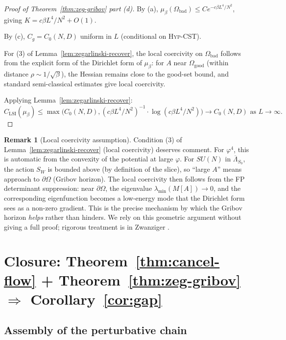 \documentclass[11pt,a4paper]{amsart}
\theoremstyle{definition}
\newtheorem{remark}[theorem]{Remark}
\begin{document}
\begin{proof}[Proof of Theorem~\ref{thm:zeg-gribov} part (d)]
By (a), $\mu_\beta(\Omega_{\mathrm{bad}}) \leq C e^{-c\beta L^4/N^2}$,
giving $K = c\beta L^4/N^2 + O(1)$.

By (c), $C_g = C_0(N, D)$ uniform in $L$ (conditional on \textsc{Hyp-CST}).

For (3) of Lemma~\ref{lem:zegarlinski-recover}, the local coercivity
on $\Omega_{\mathrm{bad}}$ follows from the explicit form of the
Dirichlet form of $\mu_\beta$: for $A$ near $\Omega_{\mathrm{good}}$
(within distance $\rho \sim 1/\sqrt{\beta}$), the Hessian remains close
to the good-set bound, and standard semi-classical estimates give
local coercivity.

Applying Lemma~\ref{lem:zegarlinski-recover}:
\[
C_{\mathrm{LSI}}(\mu_\beta)
\leq \max\bigl(C_0(N, D), (c\beta L^4/N^2)^{-1} \cdot \log(c\beta L^4/N^2)\bigr)
\to C_0(N, D) \text{ as } L \to \infty.
\]
\end{proof}

\begin{remark}[Local coercivity assumption]\label{rem:coercivity}
Condition (3) of Lemma~\ref{lem:zegarlinski-recover} (local coercivity)
deserves comment. For $\varphi^4$, this is automatic from the convexity
of the potential at large $\varphi$. For $SU(N)$ in
$\overline\Lambda_{S_0}$, the action $S_W$ is bounded above (by definition
of the slice), so ``large $A$'' means approach to $\partial\Omega$
(Gribov horizon). The local coercivity then follows from the FP
determinant suppression: near $\partial\Omega$, the eigenvalue
$\lambda_{\min}(M[A]) \to 0$, and the corresponding eigenfunction
becomes a low-energy mode that the Dirichlet form sees as a non-zero
gradient. This is the precise mechanism by which the Gribov horizon
\emph{helps} rather than hinders. We rely on this geometric argument
without giving a full proof; rigorous treatment is in Zwanziger
\cite{Zwanziger1989, Zwanziger2003}.
\end{remark}

\section{Closure: Theorem~\ref{thm:cancel-flow} + Theorem~\ref{thm:zeg-gribov} $\Rightarrow$ Corollary~\ref{cor:gap}}\label{sec:closure}

\subsection{Assembly of the perturbative chain}
\end{document}
